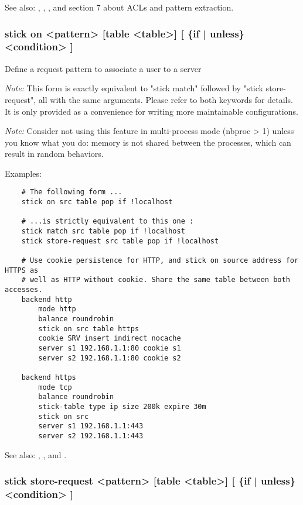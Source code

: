   See also: , , ,  and section 7
             about ACLs and pattern extraction.


\subsubsection[stick on]{stick on <pattern> [table <table>] [ \{if | unless\} <condition> ]}


  Define a request pattern to associate a user to a server


  \emph{Note:} This form is exactly equivalent to "stick match" followed by
         "stick store-request", all with the same arguments. Please refer
         to both keywords for details. It is only provided as a convenience
         for writing more maintainable configurations.

  \emph{Note:} Consider not using this feature in multi-process mode (nbproc > 1)
         unless you know what you do: memory is not shared between the
         processes, which can result in random behaviors.

  Examples:
  \begin{verbatim}
    # The following form ...
    stick on src table pop if !localhost

    # ...is strictly equivalent to this one :
    stick match src table pop if !localhost
    stick store-request src table pop if !localhost

    # Use cookie persistence for HTTP, and stick on source address for HTTPS as
    # well as HTTP without cookie. Share the same table between both accesses.
    backend http
        mode http
        balance roundrobin
        stick on src table https
        cookie SRV insert indirect nocache
        server s1 192.168.1.1:80 cookie s1
        server s2 192.168.1.1:80 cookie s2

    backend https
        mode tcp
        balance roundrobin
        stick-table type ip size 200k expire 30m
        stick on src
        server s1 192.168.1.1:443
        server s2 192.168.1.1:443
   \end{verbatim}

  See also: , ,  and .


\subsubsection[stick store-request]{stick store-request <pattern> [table <table>] [ \{if | unless\} <condition> ]}

